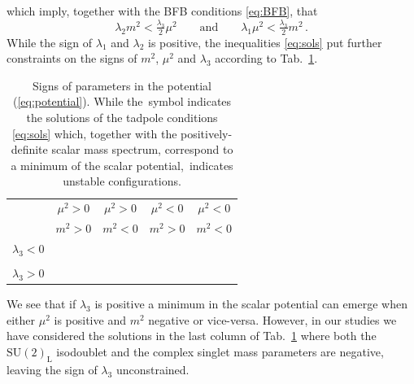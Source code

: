 \documentclass[a4paper,11pt]{article}
\renewcommand{\(}{\left(}
\renewcommand{\)}{\right)}
\renewcommand{\[}{\left[}
\renewcommand{\]}{\right]}
\newcommand{\SU}[2]{\mathrm{SU}(#1)_{\mathrm{#2}}}		%
\newcommand{\xmark}{\ding{55}}%
\begin{document}
which imply, together with the BFB conditions \eqref{eq:BFB}, that
%
\begin{equation}
\lambda_2 m^2 < \tfrac{\lambda_3}{2} \mu^2 
\qquad
\text{and}
\qquad
\lambda_1 \mu^2 < \tfrac{\lambda_3}{2} m^2 \,.
\label{eq:sols}
\end{equation}
While the sign of $\lambda_1$ and $\lambda_2$ is positive, the inequalities \eqref{eq:sols} put further constraints on the signs of $m^2$, $\mu^2$ and $\lambda_3$ according to Tab.~\ref{tab:signs}.
%
\begin{table}[htb!]
	\begin{center}
		\begin{tabular}{ccccc}
			\toprule                     
			& $\mu^2 > 0$ & $\mu^2 > 0$ & $\mu^2 < 0$ & $\mu^2 < 0$  	\\
			& $m^2 > 0$ & $m^2 < 0$ & $m^2 > 0$ & $m^2 < 0$  	\\        
			\midrule
			$\lambda_3 < 0 $     			    							& \xmark		& \checkmark	&	\checkmark & \checkmark	\\
			& 		& 	&	 & 	\\
			$\lambda_3 > 0$     			    							& \xmark		& \xmark	&	\xmark &  \checkmark \\
			\bottomrule
		\end{tabular} 
		\caption{Signs of parameters in the potential (\ref{eq:potential}).
While the \checkmark\,symbol indicates the solutions of the tadpole conditions \eqref{eq:sols} which, together with the positively-definite scalar mass spectrum, correspond to a minimum of the scalar potential, \xmark\,indicates unstable configurations.}
		\label{tab:signs}  
	\end{center}
\end{table} 
%
We see that if $\lambda_3$ is positive a minimum in the scalar potential can emerge when either $\mu^2$ is positive and $m^2$ negative or vice-versa. However, in our studies we have considered the solutions in the last column of Tab.~\ref{tab:signs} where both the $\SU{2}{L}$ isodoublet and the complex singlet mass parameters are negative, leaving the sign of $\lambda_3$ unconstrained.
\end{document}
